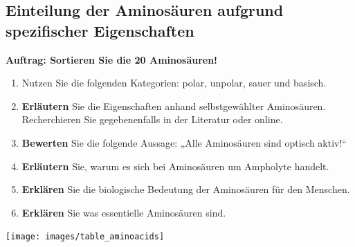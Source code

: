 \documentclass{scrartcl}  %
\begin{document}
\newpage
		\subsection{Einteilung der Aminosäuren aufgrund spezifischer Eigenschaften}
		
			\textbf{Auftrag: Sortieren Sie die 20 Aminosäuren!}
			\begin{enumerate}
				\item Nutzen Sie die folgenden Kategorien: polar, unpolar, sauer und basisch.
			    \item \textbf{Erläutern} Sie die Eigenschaften anhand selbstgewählter Aminosäuren. Recherchieren Sie gegebenenfalls in der Literatur oder online.
			    \item \textbf{Bewerten} Sie die folgende Aussage: „Alle Aminosäuren sind optisch aktiv!“
			    \item \textbf{Erläutern} Sie, warum es sich bei Aminosäuren um Ampholyte handelt.
			    \item \textbf{Erklären} Sie die biologische Bedeutung der Aminosäuren für den Menschen.
			    \item \textbf{Erklären} Sie was essentielle Aminosäuren sind.
			\end{enumerate} 
			
			\begin{center}
				\texttt{[image: images/table\_aminoacids]}
			\end{center}
			
\end{document}
